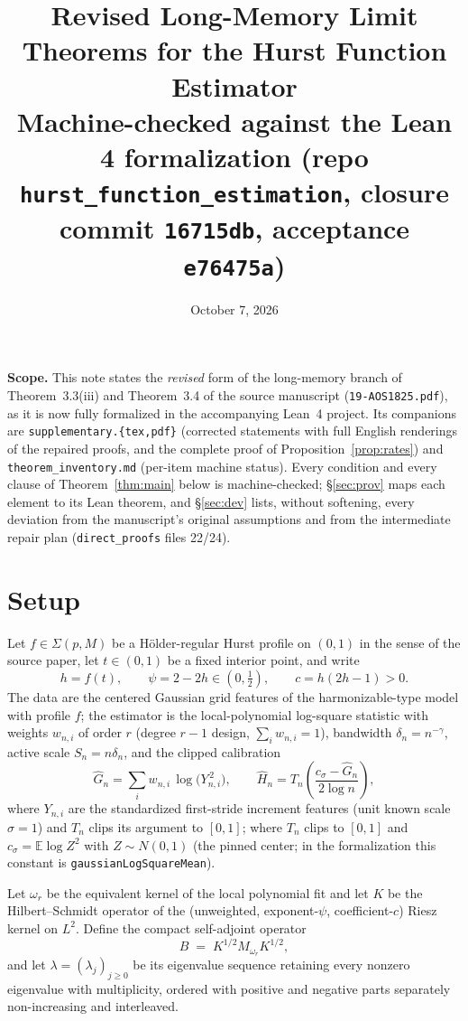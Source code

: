 \documentclass[11pt]{article}
\title{Revised Long-Memory Limit Theorems for the Hurst Function Estimator\\
\large Machine-checked against the Lean 4 formalization (repo \texttt{hurst\_function\_estimation},
closure commit \texttt{16715db}, acceptance \texttt{e76475a})}
\author{}
\date{October 7, 2026}
\theoremstyle{definition}
\theoremstyle{remark}
\begin{document}
\maketitle

\noindent\textbf{Scope.} This note states the \emph{revised} form of the long-memory
branch of Theorem~3.3(iii) and Theorem~3.4 of the source manuscript
(\texttt{19-AOS1825.pdf}), as it is now fully formalized in the accompanying Lean~4
project. Its companions are \texttt{supplementary.\{tex,pdf\}} (corrected
statements with full English renderings of the repaired proofs, and the
complete proof of Proposition~\ref{prop:rates}) and
\texttt{theorem\_inventory.md} (per-item machine status). Every condition and every clause of Theorem~\ref{thm:main} below is
machine-checked; \S\ref{sec:prov} maps each element to its Lean theorem, and
\S\ref{sec:dev} lists, without softening, every deviation from the manuscript's
original assumptions and from the intermediate repair plan
(\texttt{direct\_proofs} files 22/24).

\section{Setup}

Let $f \in \Sigma(p,M)$ be a H\"older-regular Hurst profile on $(0,1)$ in the sense
of the source paper, let $t \in (0,1)$ be a fixed interior point, and write
\[
h = f(t), \qquad \psi = 2 - 2h \in (0,\tfrac12), \qquad c = h(2h-1) > 0 .
\]
The data are the centered Gaussian grid features of the harmonizable-type model
with profile $f$; the estimator is the local-polynomial log-square statistic with
weights $w_{n,i}$ of order $r$ (degree $r-1$ design, $\sum_i w_{n,i}=1$), bandwidth
$\delta_n = n^{-\gamma}$, active scale $S_n = n\delta_n$, and the clipped
calibration
\[
\widehat G_n = \sum_{i} w_{n,i}\,\log\bigl(Y_{n,i}^{\,2}\bigr),
\qquad
\widehat H_n = T_n\!\left(\frac{c_\sigma - \widehat G_n}{2\log n}\right),
\]
where $Y_{n,i}$ are the standardized first-stride increment features (unit
known scale $\sigma=1$) and $T_n$ clips its argument to $[0,1]$;
where $T_n$ clips to $[0,1]$ and $c_\sigma = \mathbb{E}\log Z^2$ with
$Z \sim N(0,1)$ (the pinned center; in the formalization this constant is
\texttt{gaussianLogSquareMean}).

Let $\omega_r$ be the equivalent kernel of the local polynomial fit and let
$K$ be the Hilbert--Schmidt operator of the (unweighted, exponent-$\psi$,
coefficient-$c$) Riesz kernel on $L^2$. Define the compact self-adjoint operator
\[
B \;=\; K^{1/2} M_{\omega_r} K^{1/2},
\]
and let $\lambda = (\lambda_j)_{j\ge0}$ be its eigenvalue sequence retaining every
nonzero eigenvalue with multiplicity, ordered with positive and negative parts
separately non-increasing and interleaved.
\end{document}

